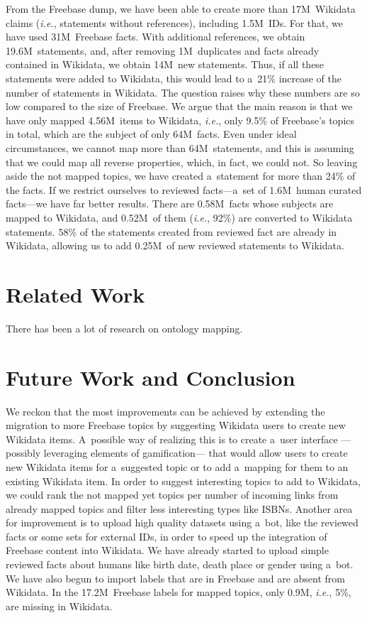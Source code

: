 \documentclass{acm_proc_article-sp}
\begin{document}
From the Freebase dump, we have been able to create more than 17M~Wikidata claims
(\emph{i.e.}, statements without references), including 1.5M~IDs.
For that, we have used 31M~Freebase facts.
With additional references, we obtain 19.6M~statements, and, after removing 1M~duplicates
and facts already contained in Wikidata, we obtain 14M~new statements.
Thus, if all these statements were added to Wikidata,
this would lead to a~21\% increase of the number of statements in Wikidata.
The question raises why these numbers are so low compared to the size of Freebase.
We argue that the main reason is that we have only mapped 4.56M~items to Wikidata,
\emph{i.e.}, only 9.5\% of Freebase's topics in total, which are the subject of only 64M~facts.
Even under ideal circumstances, we cannot map more than 64M~statements,
and this is assuming that we could map all reverse properties, which, in fact, we could not.
So leaving aside the not mapped topics, we have created a~statement for more than 24\% of the facts.
If we restrict ourselves to reviewed facts---a~set of 1.6M~human curated facts---we have far better results.
There are 0.58M~facts whose subjects are mapped to Wikidata, and 0.52M~of them
(\emph{i.e.}, 92\%) are converted to Wikidata statements.
58\% of the statements created from reviewed fact are already in Wikidata,
allowing us to add 0.25M~of new reviewed statements to Wikidata.

\section{Related Work}\label{sec:related-work}

There has been a lot of research on ontology mapping.

\section{Future Work and Conclusion}\label{sec:future-work-and-conclusion}

We reckon that the most improvements can be achieved
by extending the migration to more Freebase topics
by suggesting Wikidata users to create new Wikidata items.
A~possible way of realizing this is to create a~user interface%
---possibly leveraging elements of gamification---%
that would allow users to create new Wikidata items for a~suggested topic
or to add a~mapping for them to an existing Wikidata item.
In order to suggest interesting topics to add to Wikidata,
we could rank the not mapped yet topics per number of incoming links
from already mapped topics and filter less interesting types like ISBNs.
Another area for improvement is to upload high quality datasets using a~bot,
like the reviewed facts or some sets for external IDs,
in order to speed up the integration of Freebase content into Wikidata.
We have already started to upload simple reviewed facts about humans
like birth date, death place or gender using a~bot.
We have also begun to import labels that are in Freebase and are absent from Wikidata.
In the 17.2M~Freebase labels for mapped topics, only 0.9M, \emph{i.e.}, 5\%, are missing in Wikidata.
\end{document}

